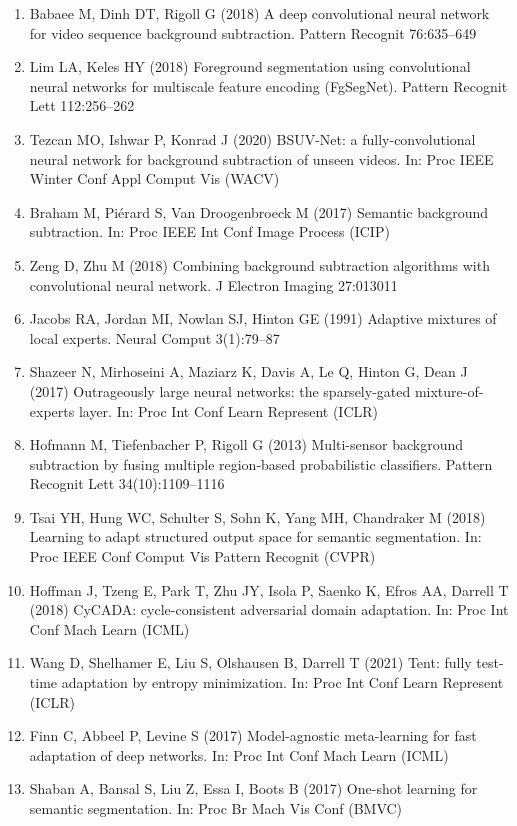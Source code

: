 \documentclass[sn-basic]{sn-jnl}
\begin{document}
\begin{enumerate}
\item[{[12]}] Babaee M, Dinh DT, Rigoll G (2018) A deep convolutional neural network for video sequence background subtraction. Pattern Recognit 76:635--649
\item[{[13]}] Lim LA, Keles HY (2018) Foreground segmentation using convolutional neural networks for multiscale feature encoding (FgSegNet). Pattern Recognit Lett 112:256--262
\item[{[14]}] Tezcan MO, Ishwar P, Konrad J (2020) BSUV-Net: a fully-convolutional neural network for background subtraction of unseen videos. In: Proc IEEE Winter Conf Appl Comput Vis (WACV)
\item[{[15]}] Braham M, Pi\'erard S, Van Droogenbroeck M (2017) Semantic background subtraction. In: Proc IEEE Int Conf Image Process (ICIP)
\item[{[16]}] Zeng D, Zhu M (2018) Combining background subtraction algorithms with convolutional neural network. J Electron Imaging 27:013011
\item[{[17]}] Jacobs RA, Jordan MI, Nowlan SJ, Hinton GE (1991) Adaptive mixtures of local experts. Neural Comput 3(1):79--87
\item[{[18]}] Shazeer N, Mirhoseini A, Maziarz K, Davis A, Le Q, Hinton G, Dean J (2017) Outrageously large neural networks: the sparsely-gated mixture-of-experts layer. In: Proc Int Conf Learn Represent (ICLR)
\item[{[19]}] Hofmann M, Tiefenbacher P, Rigoll G (2013) Multi-sensor background subtraction by fusing multiple region-based probabilistic classifiers. Pattern Recognit Lett 34(10):1109--1116
\item[{[20]}] Tsai YH, Hung WC, Schulter S, Sohn K, Yang MH, Chandraker M (2018) Learning to adapt structured output space for semantic segmentation. In: Proc IEEE Conf Comput Vis Pattern Recognit (CVPR)
\item[{[21]}] Hoffman J, Tzeng E, Park T, Zhu JY, Isola P, Saenko K, Efros AA, Darrell T (2018) CyCADA: cycle-consistent adversarial domain adaptation. In: Proc Int Conf Mach Learn (ICML)
\item[{[22]}] Wang D, Shelhamer E, Liu S, Olshausen B, Darrell T (2021) Tent: fully test-time adaptation by entropy minimization. In: Proc Int Conf Learn Represent (ICLR)
\item[{[23]}] Finn C, Abbeel P, Levine S (2017) Model-agnostic meta-learning for fast adaptation of deep networks. In: Proc Int Conf Mach Learn (ICML)
\item[{[24]}] Shaban A, Bansal S, Liu Z, Essa I, Boots B (2017) One-shot learning for semantic segmentation. In: Proc Br Mach Vis Conf (BMVC)

\end{enumerate}
\end{document}
